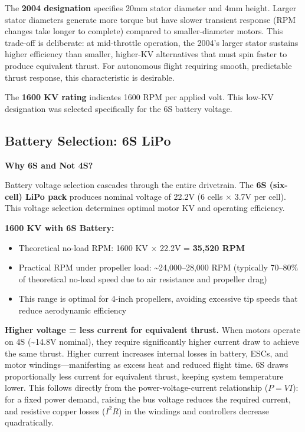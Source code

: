The \textbf{2004 designation} specifies 20mm stator diameter and 4mm height. Larger stator diameters generate more torque but have slower transient response (RPM changes take longer to complete) compared to smaller-diameter motors.\cite{bershadsky2016propulsion} This trade-off is deliberate: at mid-throttle operation, the 2004's larger stator sustains higher efficiency than smaller, higher-KV alternatives that must spin faster to produce equivalent thrust. For autonomous flight requiring smooth, predictable thrust response, this characteristic is desirable.

The \textbf{1600 KV rating} indicates 1600 RPM per applied volt. This low-KV designation was selected specifically for the 6S battery voltage.

\subsection{Battery Selection: 6S LiPo}

\textbf{Why 6S and Not 4S?}

Battery voltage selection cascades through the entire drivetrain. The \textbf{6S (six-cell) LiPo pack} produces nominal voltage of 22.2V (6 cells \(\times\) 3.7V per cell).\cite{bershadsky2016propulsion} This voltage selection determines optimal motor KV and operating efficiency.

\textbf{1600 KV with 6S Battery:}
\begin{itemize}
    \item Theoretical no-load RPM: 1600 KV \(\times\) 22.2V = \textbf{35,520 RPM}\cite{bershadsky2016propulsion}
    \item Practical RPM under propeller load: \textasciitilde24,000--28,000 RPM (typically 70--80\% of theoretical no-load speed due to air resistance and propeller drag)\cite{bershadsky2016propulsion}
    \item This range is optimal for 4-inch propellers, avoiding excessive tip speeds that reduce aerodynamic efficiency
\end{itemize}

\textbf{Higher voltage = less current for equivalent thrust.} When motors operate on 4S (\textasciitilde14.8V nominal), they require significantly higher current draw to achieve the same thrust.\cite{bershadsky2016propulsion} Higher current increases internal losses in battery, ESCs, and motor windings---manifesting as excess heat and reduced flight time. 6S draws proportionally less current for equivalent thrust, keeping system temperature lower. This follows directly from the power-voltage-current relationship ($P = VI$): for a fixed power demand, raising the bus voltage reduces the required current, and resistive copper losses ($I^2R$) in the windings and controllers decrease quadratically.\cite{hughes2013electric}

